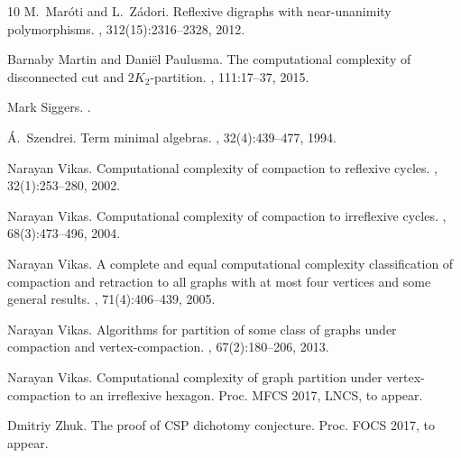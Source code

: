 \documentclass[a4paper,12pt]{article}
\theoremstyle{remark}
\begin{document}
\begin{thebibliography}{10}
M.~Mar\'oti and L.~Z\'adori.
\newblock Reflexive digraphs with near-unanimity polymorphisms.
, 312(15):2316--2328, 2012.

Barnaby Martin and Dani{\"{e}}l Paulusma.
\newblock The computational complexity of disconnected cut and
  $2{K}_2$-partition.
, 111:17--37, 2015.

Mark Siggers.
.

{\'A}.~Szendrei.
\newblock Term minimal algebras.
, 32(4):439--477, 1994.

Narayan Vikas.
\newblock Computational complexity of compaction to reflexive cycles.
, 32(1):253--280, 2002.

Narayan Vikas.
\newblock Computational complexity of compaction to irreflexive cycles.
, 68(3):473--496, 2004.

Narayan Vikas.
\newblock A complete and equal computational complexity classification of
  compaction and retraction to all graphs with at most four vertices and some
  general results.
, 71(4):406--439, 2005.

Narayan Vikas.
\newblock Algorithms for partition of some class of graphs under compaction and
  vertex-compaction.
, 67(2):180--206, 2013.

Narayan Vikas.
\newblock Computational complexity of graph partition under vertex-compaction
  to an irreflexive hexagon.
\newblock Proc. MFCS 2017, LNCS, to appear.

Dmitriy Zhuk.
\newblock The proof of {CSP} dichotomy conjecture.
Proc. FOCS 2017, to appear.

\end{thebibliography}
\end{document}
